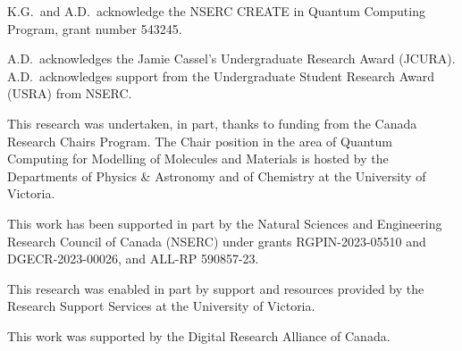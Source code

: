 \documentclass{juliacon}
\begin{document}
K.G.~and A.D.~acknowledge the NSERC CREATE in Quantum Computing Program, grant number 543245.

A.D.~acknowledges the Jamie Cassel's Undergraduate Research Award (JCURA). A.D.~acknowledges support from the Undergraduate Student Research Award (USRA) from NSERC.

This research was undertaken, in part, thanks to funding from the Canada Research Chairs Program. The Chair position in the area of Quantum Computing for Modelling of Molecules and Materials is hosted by the Departments of Physics \& Astronomy and of Chemistry at the University of Victoria. 

This work has been supported in part by the Natural Sciences and Engineering Research Council of Canada (NSERC) under grants RGPIN-2023-05510 and DGECR-2023-00026, and ALL-RP 590857-23.

This research was enabled in part by support and resources provided by the Research Support Services at the University of Victoria.

This work was supported by the Digital Research Alliance of Canada.



\end{document}
